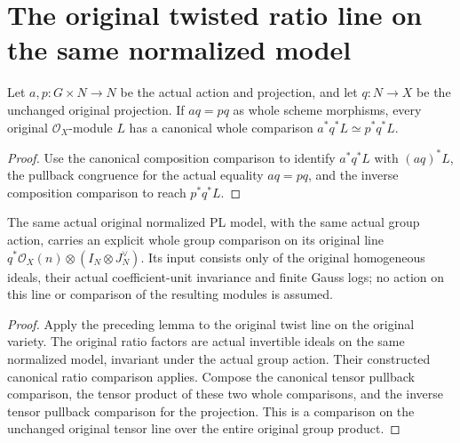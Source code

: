 \section{The original twisted ratio line on the same normalized model}

\begin{lemma}
\label{lem:pl-original-invariant-projection-line-comparison}
\leanok
Let $a,p:G\times N\to N$ be the actual action and projection, and let
$q:N\to X$ be the unchanged original projection. If $a q=p q$ as whole
scheme morphisms, every original $\mathcal O_X$-module $L$ has a canonical
whole comparison $a^*q^*L\simeq p^*q^*L$.
\end{lemma}
\begin{proof}
Use the canonical composition comparison to identify $a^*q^*L$ with
$(a q)^*L$, the pullback congruence for the actual equality $a q=p q$,
and the inverse composition comparison to reach $p^*q^*L$.
\end{proof}

\begin{theorem}
\label{thm:pl-original-normalized-twisted-ratio-group-comparison}
\leanok
{}
The same actual original normalized PL model, with the same actual group
action, carries an explicit whole group comparison on its original line
$q^*\mathcal O_X(n)\otimes(I_N\otimes J_N^\vee)$. Its input consists only
of the original homogeneous ideals, their actual coefficient-unit
invariance and finite Gauss logs; no action on this line or comparison of
the resulting modules is assumed.
\end{theorem}
\begin{proof}
Apply the preceding lemma to the original twist line on the original
variety. The original ratio factors are actual invertible ideals on the
same normalized model, invariant under the actual group action. Their
constructed canonical ratio comparison applies. Compose the
canonical tensor pullback comparison, the tensor product of these two
whole comparisons, and the inverse tensor pullback comparison for the
projection. This is a comparison on the unchanged original tensor line
over the entire original group product.
\end{proof}
